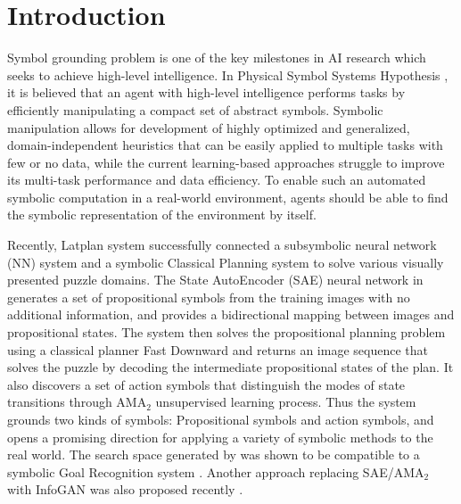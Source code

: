 \section{Introduction}


Symbol grounding problem \cite{harnad1990symbol,Steels2008} is one of the key milestones in AI research
which seeks to achieve high-level intelligence.
In Physical Symbol Systems Hypothesis \cite{newell1976computer}, it is believed that
an agent with high-level intelligence performs tasks by efficiently manipulating a compact set of abstract symbols.
% 
Symbolic manipulation
allows for
development of highly optimized and generalized, domain-independent heuristics \cite{Hoffmann01,Helmert2009}
that can be easily applied to multiple tasks with few or no data,
while the current learning-based approaches struggle to improve its multi-task performance and data efficiency.
% 
To enable such an automated symbolic computation in a real-world environment,
agents should be able to find the symbolic representation of the environment by itself.

Recently, Latplan system \cite{Asai2018} successfully
connected a subsymbolic neural network (NN) system and a symbolic Classical Planning system
to solve various visually presented puzzle domains.
The State AutoEncoder (SAE) neural network in \latentplanner
generates a set of propositional symbols from the training images with no additional information,
and provides a bidirectional mapping between images and propositional states.
% 
The system then solves the propositional planning problem using a classical planner Fast Downward \cite{Helmert04}
and returns an image sequence that solves the puzzle
by decoding the intermediate propositional states of the plan.
It also discovers a set of action symbols that distinguish the modes of
state transitions through AMA$_2$ unsupervised learning process.
Thus the system grounds two kinds of symbols:
Propositional symbols and action symbols,
% 
and opens a promising direction for applying a variety of symbolic methods to the real world.
The search space generated by \latentplanner was shown to be compatible
to a symbolic Goal Recognition system \cite{amado2018goal}.
Another approach replacing SAE/AMA$_2$ with InfoGAN was also proposed recently \cite{kurutach2018learning}.

